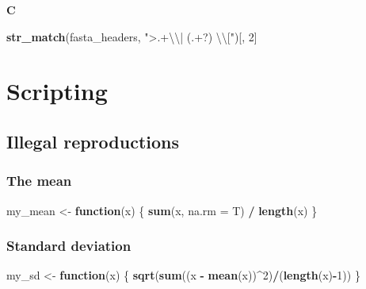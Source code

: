 \documentclass[]{book}
\newenvironment{Shaded}{\begin{snugshade}}{\end{snugshade}}
\newcommand{\CharTok}[1]{\textcolor[rgb]{0.31,0.60,0.02}{#1}}
\newcommand{\ControlFlowTok}[1]{\textcolor[rgb]{0.13,0.29,0.53}{\textbf{#1}}}
\newcommand{\DataTypeTok}[1]{\textcolor[rgb]{0.13,0.29,0.53}{#1}}
\newcommand{\DecValTok}[1]{\textcolor[rgb]{0.00,0.00,0.81}{#1}}
\newcommand{\KeywordTok}[1]{\textcolor[rgb]{0.13,0.29,0.53}{\textbf{#1}}}
\newcommand{\NormalTok}[1]{#1}
\newcommand{\OperatorTok}[1]{\textcolor[rgb]{0.81,0.36,0.00}{\textbf{#1}}}
\newcommand{\StringTok}[1]{\textcolor[rgb]{0.31,0.60,0.02}{#1}}
\begin{document}
\textbf{C}

\begin{Shaded}
\begin{Highlighting}[]
\KeywordTok{str_match}\NormalTok{(fasta_headers, }\StringTok{">.+}\CharTok{\textbackslash{}\textbackslash{}}\StringTok{| (.+?) }\CharTok{\textbackslash{}\textbackslash{}}\StringTok{["}\NormalTok{)[, }\DecValTok{2}\NormalTok{]}
\end{Highlighting}
\end{Shaded}

\hypertarget{scripting-2}{%
\section{Scripting}\label{scripting-2}}

\hypertarget{illegal-reproductions-1}{%
\subsection{Illegal reproductions}\label{illegal-reproductions-1}}

\hypertarget{the-mean-1}{%
\subsubsection*{The mean}\label{the-mean-1}}

\begin{Shaded}
\begin{Highlighting}[]
\NormalTok{my_mean <-}\StringTok{ }\ControlFlowTok{function}\NormalTok{(x) \{}
        \KeywordTok{sum}\NormalTok{(x, }\DataTypeTok{na.rm =}\NormalTok{ T) }\OperatorTok{/}\StringTok{ }\KeywordTok{length}\NormalTok{(x)}
\NormalTok{\}}
\end{Highlighting}
\end{Shaded}

\hypertarget{standard-deviation-1}{%
\subsubsection*{Standard deviation}\label{standard-deviation-1}}

\begin{Shaded}
\begin{Highlighting}[]
\NormalTok{my_sd <-}\StringTok{ }\ControlFlowTok{function}\NormalTok{(x) \{}
        \KeywordTok{sqrt}\NormalTok{(}\KeywordTok{sum}\NormalTok{((x }\OperatorTok{-}\StringTok{ }\KeywordTok{mean}\NormalTok{(x))}\OperatorTok{^}\DecValTok{2}\NormalTok{)}\OperatorTok{/}\NormalTok{(}\KeywordTok{length}\NormalTok{(x)}\OperatorTok{-}\DecValTok{1}\NormalTok{))}
\NormalTok{\}}
\end{Highlighting}
\end{Shaded}
\end{document}
